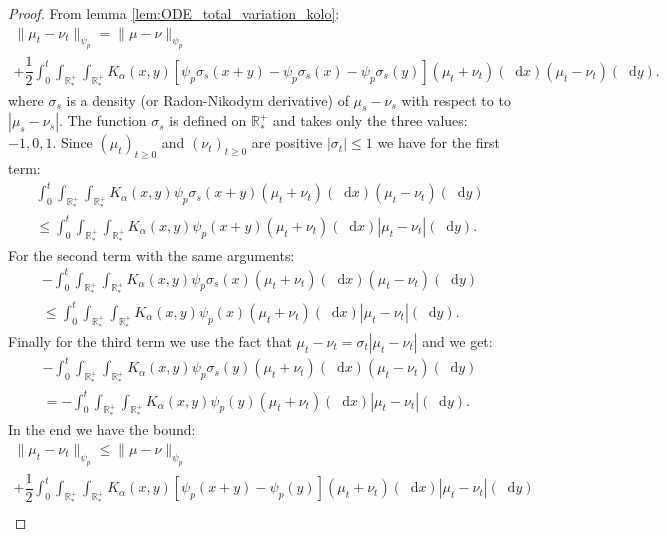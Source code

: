\documentclass[11pt,a4paper]{article}
\newcommand{\RRP}{\mathbb{R}^+_*}
\newcommand{\Proc}[1]{\left(#1\right)_{t\geq 0}}
\newcommand{\dd}{\mathop{}\!\mathrm{d}}
\begin{document}
\begin{proof}
    From lemma \ref{lem:ODE_total_variation_kolo}:
    \begin{multline*}
        \| \mu_t - \nu_t\|_{\psi_p} = \|\mu- \nu\|_{\psi_p} \\
        + \dfrac12\int_0^t \int_{\RRP}\int_{\RRP} K_\alpha(x,y) \left[\psi_p\sigma_s(x+y) - \psi_p\sigma_s(x) - \psi_p\sigma_s(y) \right]\left(\mu_t + \nu_t\right)(\dd x) \left(\mu_t - \nu_t\right)(\dd y).
    \end{multline*}
    where $\sigma_s$ is a density (or Radon-Nikodym derivative) of $\mu_s - \nu_s$ with respect to to $|\mu_s - \nu_s|$. The function $\sigma_s$ is defined on $\RRP$ and takes only the three values: $-1,0,1$. Since $\Proc{\mu_t}$ and $\Proc{\nu_t}$ are positive $|\sigma_t| \leq 1$ we have for the first term:
    \begin{multline*}
        \int_0^t \int_{\RRP}\int_{\RRP} K_\alpha(x,y) \psi_p\sigma_s(x+y)\left(\mu_t + \nu_t\right)(\dd x) \left(\mu_t - \nu_t\right)(\dd y) \\
        \leq \int_0^t \int_{\RRP}\int_{\RRP} K_\alpha(x,y) \psi_p(x+y)\left(\mu_t + \nu_t\right)(\dd x) \left|\mu_t - \nu_t\right|(\dd y) .
    \end{multline*}
    For the second term with the same arguments:
    \begin{multline*}
        -\int_0^t \int_{\RRP}\int_{\RRP} K_\alpha(x,y) \psi_p\sigma_s(x)\left(\mu_t + \nu_t\right)(\dd x) \left(\mu_t - \nu_t\right)(\dd y) \\
        \leq \int_0^t \int_{\RRP}\int_{\RRP} K_\alpha(x,y) \psi_p(x)\left(\mu_t + \nu_t\right)(\dd x) \left|\mu_t - \nu_t\right|(\dd y).
    \end{multline*}
    Finally for the third term we use the fact that $\mu_t - \nu_t = \sigma_t\left| \mu_t - \nu_t \right|$ and we get:
    \begin{multline*}
        -\int_0^t \int_{\RRP}\int_{\RRP} K_\alpha(x,y) \psi_p\sigma_s(y)\left(\mu_t + \nu_t\right)(\dd x) \left(\mu_t - \nu_t\right)(\dd y) \\
        = -\int_0^t \int_{\RRP}\int_{\RRP} K_\alpha(x,y) \psi_p(y)\left(\mu_t + \nu_t\right)(\dd x) \left|\mu_t - \nu_t\right|(\dd y).
    \end{multline*}
    In the end we have the bound:
    \begin{multline*}
        \| \mu_t - \nu_t\|_{\psi_p} \leq \|\mu- \nu\|_{\psi_p} \\
        + \dfrac12\int_0^t \int_{\RRP}\int_{\RRP} K_\alpha(x,y) \left[\psi_p(x+y) - \psi_p(y) \right]\left(\mu_t + \nu_t\right)(\dd x) \left|\mu_t - \nu_t\right|(\dd y) \\

\end{multline*}
\end{proof}
\end{document}
